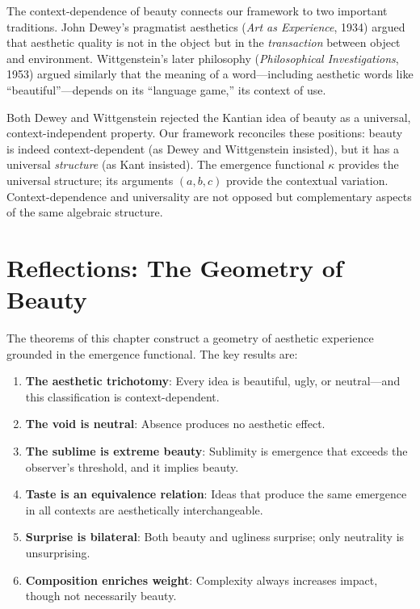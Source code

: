 \begin{remark}
The context-dependence of beauty connects our framework to two important traditions.  John Dewey's pragmatist aesthetics (\textit{Art as Experience}, 1934) argued that aesthetic quality is not in the object but in the \emph{transaction} between object and environment.  Wittgenstein's later philosophy (\textit{Philosophical Investigations}, 1953) argued similarly that the meaning of a word---including aesthetic words like ``beautiful''---depends on its ``language game,'' its context of use.

Both Dewey and Wittgenstein rejected the Kantian idea of beauty as a universal, context-independent property.  Our framework reconciles these positions: beauty is indeed context-dependent (as Dewey and Wittgenstein insisted), but it has a universal \emph{structure} (as Kant insisted).  The emergence functional $\kappa$ provides the universal structure; its arguments $(a, b, c)$ provide the contextual variation.  Context-dependence and universality are not opposed but complementary aspects of the same algebraic structure.
\end{remark}

\section{Reflections: The Geometry of Beauty}

The theorems of this chapter construct a geometry of aesthetic experience
grounded in the emergence functional.  The key results are:

\begin{enumerate}
\item \textbf{The aesthetic trichotomy}: Every idea is beautiful, ugly, or
neutral---and this classification is context-dependent.

\item \textbf{The void is neutral}: Absence produces no aesthetic effect.

\item \textbf{The sublime is extreme beauty}: Sublimity is emergence that
exceeds the observer's threshold, and it implies beauty.

\item \textbf{Taste is an equivalence relation}: Ideas that produce the
same emergence in all contexts are aesthetically interchangeable.

\item \textbf{Surprise is bilateral}: Both beauty and ugliness surprise;
only neutrality is unsurprising.

\item \textbf{Composition enriches weight}: Complexity always increases
impact, though not necessarily beauty.
\end{enumerate}

